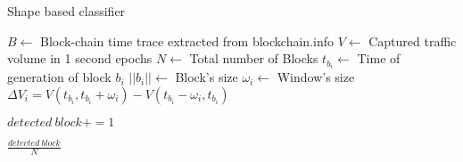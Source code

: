 \begin{algorithm}[h]
\caption{Shape based classifier}
\label{algo:window_based_scheme}
\begin{algorithmic}[1]
\State $B \gets $ Block-chain time trace extracted from blockchain.info 
\State $V \gets $ Captured traffic volume in 1 second epochs
\State $N \gets$ Total number of Blocks
\State $t_{b_i} \gets $ Time of generation of block $b_i$
\State $||b_i|| \gets $ Block's size
\State $\omega_i \gets$ Window's size
\State $\Delta V_i = V(t_{b_i}, t_{b_i} +\omega_i) - V(t_{b_i}-\omega_i, t_{b_i})$ 

\State $detected\ block += 1$

\EndIf
\EndFor
\State \Return $\frac{detected\ block}{N}$
\EndProcedure
\end{algorithmic}

\end{algorithm}
